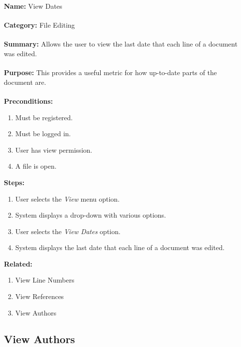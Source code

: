 \documentclass[14pt, a4paper]{article}
\begin{document}
\begin{framed}
	\noindent\textbf{Name:} View Dates \\ \\
	\textbf{Category:} File Editing \\ \\
	\textbf{Summary:} Allows the user to view the last date that each line of a document was edited. \\ \\
	\textbf{Purpose:} This provides a useful metric for how up-to-date parts of the document are. \\ \\
	\textbf{Preconditions:} 
	\begin{enumerate}
		\item Must be registered.
		\item Must be logged in.
		\item User has view permission.
		\item A file is open.
	\end{enumerate}
	\textbf{Steps:}
	\begin{enumerate}
		\item User selects the \textit{View} menu option.
		\item System displays a drop-down with various options.
		\item User selects the \textit{View Dates} option.
		\item System displays the last date that each line of a document was edited.
	\end{enumerate}
	\textbf{Related:}
	\begin{enumerate}
		\item View Line Numbers
		\item View References
		\item View Authors
	\end{enumerate}
\end{framed}

\newpage

\subsection{View Authors}
\end{document}
